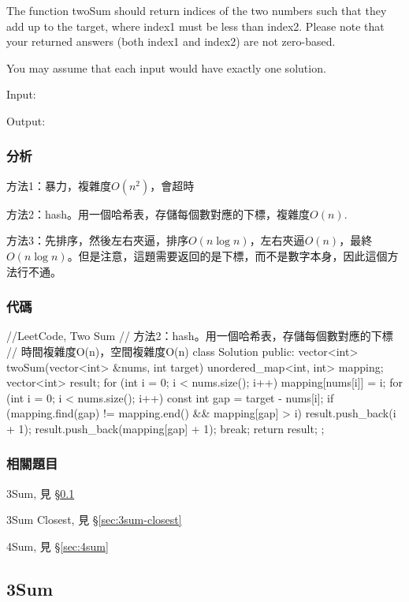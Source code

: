 The function twoSum should return indices of the two numbers such that they add up to the target, where index1 must be less than index2. Please note that your returned answers (both index1 and index2) are not zero-based.

You may assume that each input would have exactly one solution.

Input:  

Output: 


\subsubsection{分析}
方法1：暴力，複雜度$O(n^2)$，會超時

方法2：hash。用一個哈希表，存儲每個數對應的下標，複雜度$O(n)$.

方法3：先排序，然後左右夾逼，排序$O(n\log n)$，左右夾逼$O(n)$，最終$O(n\log n)$。但是注意，這題需要返回的是下標，而不是數字本身，因此這個方法行不通。


\subsubsection{代碼}
\begin{Code}
//LeetCode, Two Sum
// 方法2：hash。用一個哈希表，存儲每個數對應的下標
// 時間複雜度O(n)，空間複雜度O(n)
class Solution {
public:
    vector<int> twoSum(vector<int> &nums, int target) {
        unordered_map<int, int> mapping;
        vector<int> result;
        for (int i = 0; i < nums.size(); i++) {
            mapping[nums[i]] = i;
        }
        for (int i = 0; i < nums.size(); i++) {
            const int gap = target - nums[i];
            if (mapping.find(gap) != mapping.end() && mapping[gap] > i) {
                result.push_back(i + 1);
                result.push_back(mapping[gap] + 1);
                break;
            }
        }
        return result;
    }
};
\end{Code}


\subsubsection{相關題目}
\begindot
\item 3Sum, 見 \S \ref{sec:3sum}
\item 3Sum Closest, 見 \S \ref{sec:3sum-closest}
\item 4Sum, 見 \S \ref{sec:4sum}
\myenddot


\subsection{3Sum} %
\label{sec:3sum}



